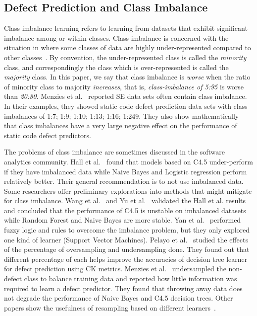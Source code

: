\documentclass[sigconf,review, anonymous]{acmart}
\theoremstyle{break}
\theoremstyle{break}
\begin{document}
\subsection{Defect Prediction and Class Imbalance}
\label{sect:imbalance}

Class imbalance learning refers to learning from datasets that exhibit significant imbalance among or within classes. Class imbalance  is concerned with the situation in where some classes of data are
highly under-represented compared to other classes~\cite{he2009learning}.
By convention,
the under-represented class is called the {\em minority} class,
and correspondingly the class which is over-represented is called the
{\em majority} class. In this paper, we say that class imbalance is {\em worse}
when the ratio of minority class to majority {\em increases}, that is,
{\em class-imbalance of 5:95} is worse than {\em 20:80}. Menzies et al.~\cite{menzies2007problems} reported SE data sets often contain class imbalance. In their examples, they showed static code defect prediction data sets with
class imbalances of 1:7; 1:9; 1:10; 1:13; 1:16; 1:249.
They also show mathematically that  class imbalances  have a very large  negative effect on the performance of static code defect predictors.  

The problems of class imbalance are sometimes discussed in the software analytics community.
Hall et al.~\cite{hall2012systematic} found that models based on C4.5 under-perform if they have imbalanced data while Naive Bayes and Logistic regression perform relatively better. 
Their general recommendation is to not use
imbalanced data.  
Some researchers offer preliminary explorations into methods that might mitigate for class imbalance.
Wang et al.~\cite{wang2013using} and Yu et al.~\cite{yuperformance} validated the Hall et al. results and concluded that the
performance of C4.5 is unstable on imbalanced datasets while  Random Forest and Naive Bayes are 
more stable. 
Yan et al.~\cite{yan2010software} performed fuzzy logic and rules to overcome the imbalance problem, but they only
explored one kind of learner (Support Vector Machines).
Pelayo et al.~\cite{pelayo2007applying} studied the effects of the percentage of oversampling and undersampling done. They found out that different percentage of each helps improve the accuracies of decision tree learner for defect prediction using CK metrics. Menzies et al.~\cite{menzies2008implications} undersampled the non-defect class to balance training
data and reported how little information was required to learn a defect predictor. They found that throwing away data does not degrade the performance of Naive Bayes and C4.5 decision trees. Other papers show the usefulness of resampling based on different learners~\cite{pelayo2007applying, pelayo2012evaluating, riquelme2008finding}.
\end{document}

